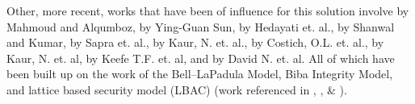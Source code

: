 Other, more recent, works that have been of influence for this solution involve \cite{mahmoud_encryption_2019} by Mahmoud and Alqumboz, \cite{sun_access_2011} by Ying-Guan Sun, \cite{hedayati_evaluation_2010} by Hedayati et. al., \cite{shanwal_secure_2013} by Shanwal and Kumar, \cite{sapra_development_2014} by Sapra et. al., \cite{kaur_performance_2004} by Kaur, N. et. al., \cite{costich_analysis_1991} by Costich, O.L. et. al., \cite{kaur_feedback_2007} by Kaur, N. et. al, \cite{keefe_database_1993} by Keefe T.F. et. al, and \cite{david_secure_1993} by David N. et. al. All of which have been built up on the work of the Bell–LaPadula Model, Biba Integrity Model, and lattice based security model (LBAC) (work referenced in \cite{bell_secure_1973}, \cite{biba_integrity_1977}, \& \cite{denning_lattice_1976}).